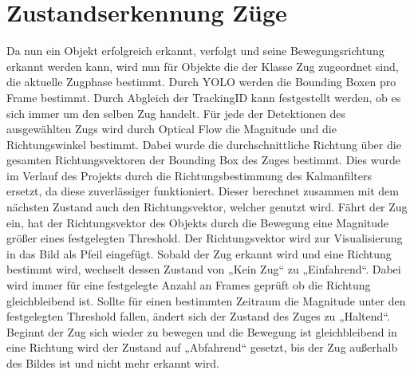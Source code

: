 \documentclass[conference]{IEEEtran}
\begin{document}
	\section{Zustandserkennung Züge}
	Da nun ein Objekt erfolgreich erkannt, verfolgt und seine Bewegungsrichtung erkannt werden kann, wird nun für Objekte die der Klasse Zug zugeordnet sind, die aktuelle Zugphase bestimmt.  
	Durch YOLO werden die Bounding Boxen pro Frame bestimmt. Durch Abgleich der TrackingID kann festgestellt werden, ob es sich immer um den selben Zug handelt. Für jede der Detektionen des ausgewählten Zugs wird durch Optical Flow die Magnitude und die Richtungswinkel bestimmt. Dabei wurde die durchschnittliche Richtung über die gesamten Richtungsvektoren der Bounding Box des Zuges bestimmt. Dies wurde im Verlauf des Projekts durch die Richtungsbestimmung des Kalmanfilters ersetzt, da diese zuverlässiger funktioniert. Dieser berechnet zusammen mit dem nächsten Zustand auch den Richtungsvektor, welcher genutzt wird. Fährt der Zug ein, hat der Richtungsvektor des Objekts durch die Bewegung eine Magnitude größer eines festgelegten Threshold. Der Richtungsvektor wird zur Visualisierung in das Bild als Pfeil eingefügt. Sobald der Zug erkannt wird und eine Richtung bestimmt wird, wechselt dessen Zustand von „Kein Zug“ zu „Einfahrend“. Dabei wird immer für eine festgelegte Anzahl an Frames geprüft ob die Richtung gleichbleibend ist. Sollte für einen bestimmten Zeitraum die Magnitude unter den festgelegten Threshold fallen, ändert sich der Zustand des Zuges zu „Haltend“. Beginnt der Zug sich wieder zu bewegen und die Bewegung ist gleichbleibend in eine Richtung wird der Zustand auf „Abfahrend“ gesetzt, bis der Zug außerhalb des Bildes ist und nicht mehr erkannt wird.
	
\end{document}
